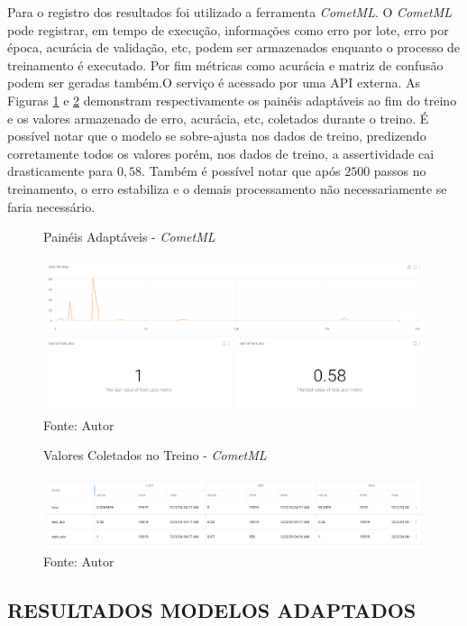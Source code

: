 Para o registro dos resultados foi utilizado a ferramenta \textit{CometML}. O \textit{CometML} pode registrar, em tempo de execução, informações como erro por lote, erro por época, acurácia de validação, etc, podem ser armazenados enquanto o processo de treinamento é executado. Por fim métricas como acurácia e matriz de confusão podem ser geradas também.O serviço é acessado  por uma \gls{API} externa. As Figuras \ref{fig:fig028} e \ref{fig:fig029} demonstram respectivamente os painéis adaptáveis ao fim do treino e os valores armazenado de erro, acurácia, etc, coletados durante o treino. É possível notar que o modelo se sobre-ajusta nos dados de treino, predizendo corretamente todos os valores porém, nos dados de treino,  a assertividade cai drasticamente para $0,58$. Também é possível notar que após $2500$ passos no treinamento, o erro estabiliza e o demais processamento não necessariamente se faria necessário.

\begin{figure}[h!]
    \centering
    \caption{Painéis Adaptáveis - \textit{CometML}}
    \includegraphics[width=1\textwidth]{figures/fig028.png}
    \caption*{Fonte: Autor}
    \label{fig:fig028}
\end{figure}


\begin{figure}[h!]
    \centering
    \caption{Valores Coletados no Treino - \textit{CometML}}
    \includegraphics[width=1\textwidth]{figures/fig029.png}
    \caption*{Fonte: Autor}
    \label{fig:fig029}
\end{figure}


\subsection{RESULTADOS MODELOS ADAPTADOS}
\label{subsec:resultados_acdc_adaptado}

